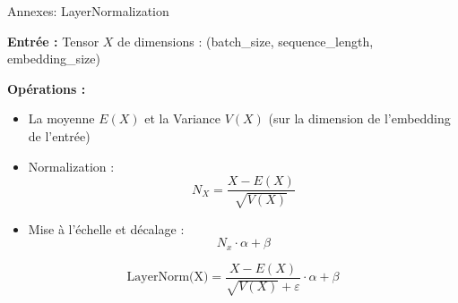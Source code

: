 \documentclass[12pt]{beamer}
\begin{document}

\begin{frame}{Annexes: LayerNormalization}

\footnotesize
\textbf{Entrée : } Tensor $X$ de dimensions : (batch\_size, sequence\_length, embedding\_size)

\textbf{Opérations : }

\begin{itemize}
	\item La moyenne $E(X)$ et la Variance $V(X)$ (sur la dimension de l'embedding de l'entrée)
	\item Normalization : $$N_X = \frac{X - E(X)}{\sqrt{V(X)}}$$
	\item Mise à l'échelle et décalage : $$N_x \cdot \alpha + \beta$$
\end{itemize}

$$\text{LayerNorm(X)} = \frac{X - E(X)}{\sqrt{V(X)}+\varepsilon} \cdot \alpha + \beta$$

\normalsize

\end{frame}


\end{document}
